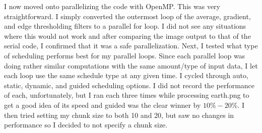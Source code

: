 \documentclass[letterpaper,11pt]{article}
\begin{document}
I now moved onto parallelizing the code with OpenMP.  This was very straightforward.  I simply converted the outermost loop of the average, gradient, and edge thresholding filters to a parallel for loop.  I did not see any situations where this would not work and after comparing the image output to that of the serial code, I confirmed that it was a safe parallelization.  Next, I tested what type of scheduling performs best for my parallel loops.  Since each parallel loop was doing rather similar computations with the same amount/type of input data, I let each loop use the same schedule type at any given time.  I cycled through auto, static, dynamic, and guided scheduling options.  I did not record the performance of each, unfortunately, but I ran each three times while processing earth.png to get a good idea of its speed and guided was the clear winner by $10\%-20\%$.  I then tried setting my chunk size to both 10 and 20, but saw no changes in performance so I decided to not specify a chunk size.  
\end{document}

